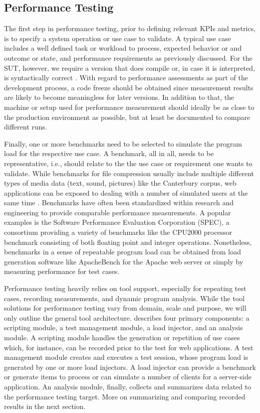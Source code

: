 \subsection{Performance Testing}
The first step in performance testing, prior to defining relevant KPIs and
metrics, is to specify a system operation or use case \citep{woodside_future_2007} to
validate. A typical use case includes a well defined task or workload to
process, expected behavior or and outcome or state, and performance
requirements as previously discussed. For the SUT, however, we require a
version that does compile or, in case it is interpreted, is syntactically
correct \citep{molyneaux_art_2014}. With regard to performance assessments as part of
the development process, a code freeze should be obtained since measurement
results are likely to become meaningless for later versions. In addition to
that,  the machine or setup used for performance measurement should ideally be
as close to the production environment as possible, but at least be documented
to compare different runs.

Finally, one or more benchmarks need to be selected to simulate  the program
load for the respective use case. A benchmark, all in all, needs to be
representative, i.e., should relate to the the use case or requirement one
 wants to validate. While benchmarks for file compression usually include
multiple different types of media data (text, sound, pictures) like the
Canterbury corpus, web applications can be exposed to dealing with a number of
simulated users at the same time \citep{molyneaux_art_2014}. Benchmarks have often been
standardized within research and engineering to provide comparable performance
measurements. A popular examples is the Software Performance Evaluation
Corporation (SPEC), a consortium providing a variety of benchmarks like the
CPU2000 processor benchmark consisting of both floating point and integer
operations. Nonetheless, benchmarks in a sense of repeatable program load can
be obtained from load generation software like ApacheBench for the Apache web
server or simply by measuring performance for test cases.

Performance testing heavily relies on tool support, especially for repeating
test cases, recording measurements, and dynamic program analysis. While the
tool solutions for performance testing vary from domain, scale and purpose, we
will only outline the general tool architecture. \cite{molyneaux_art_2014} describes
four primary components: a scripting module, a test management module, a load
injector, and an analysis module. A scripting module handles the generation or
repetition of use cases which, for instance, can be recorded prior to the test
for web applications. A test management module creates and executes a test
session, whose program load is generated by one or more load injectors. A load
injector can provide a benchmark or generate items to process or can simulate a
number of clients for a server-side application. An analysis module, finally,
collects and summarizes data related to the performance testing target. More on
summarizing and comparing recorded results in the next section.

